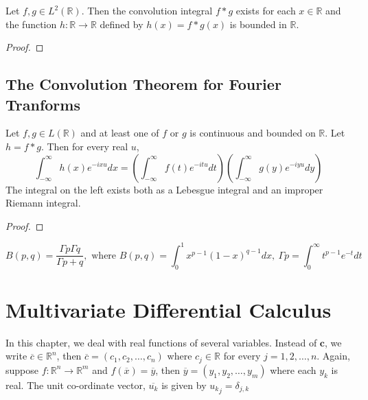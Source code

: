 \begin{theorem}
	Let \( f,g \in L^2(\mathbb{R}) \).
	Then the convolution integral $f \ast g$ exists for each \( x \in \mathbb{R} \) and the function \( h : \mathbb{R} \to \mathbb{R} \) defined by \( h(x) = f \ast g (x) \) is bounded in $\mathbb{R}$.
\end{theorem}
\begin{synopsis}
\end{synopsis}
\begin{proof}
\end{proof}

\subsection{The Convolution Theorem for Fourier Tranforms}
\begin{theorem}
	Let \( f,g \in L(\mathbb{R}) \) and at least one of $f$ or $g$ is continuous and bounded on $\mathbb{R}$.
	Let \( h = f \ast g \).
	Then for every real $u$,
	\[ \int_{-\infty}^\infty h(x) e^{-ixu} dx = \left( \int_{-\infty}^\infty f(t) e^{-itu} dt \right) \left( \int_{-\infty}^\infty g(y) e^{-iyu} dy \right) \]
	The integral on the left exists both as a Lebesgue integral and an improper Riemann integral.
\end{theorem}
\begin{synopsis}
\end{synopsis}
\begin{proof}
\end{proof}

\begin{remark}
	\[ B(p,q) = \frac{\Gamma{p} \Gamma{q}}{\Gamma{p+q}},\text{ where } B(p,q) = \int_0^1 x^{p-1} (1-x)^{q-1} dx,\ \Gamma{p} = \int_0^\infty t^{p-1} e^{-t} dt \]
\end{remark}

\section{Multivariate Differential Calculus}
	In this chapter, we deal with real functions of several variables.
	Instead of $\mathbf{c}$, we write \( \overline{c} \in \mathbb{R}^n \), then \( \overline{c} = (c_1, c_2, \dotsc, c_n) \) where \( c_j \in \mathbb{R} \) for every \(j = 1,2, \dotsc, n\).
	Again, suppose \(f : \mathbb{R}^n \to \mathbb{R}^m\) and \(f(\overline{x}) = \overline{y}\), then \(\overline{y} = (y_1, y_2, \dotsc, y_m)\) where each $y_k$ is real.
	The unit co-ordinate vector, $\overline{u_k}$ is given by \( {u_k}_j = \delta_{j,k} \)

